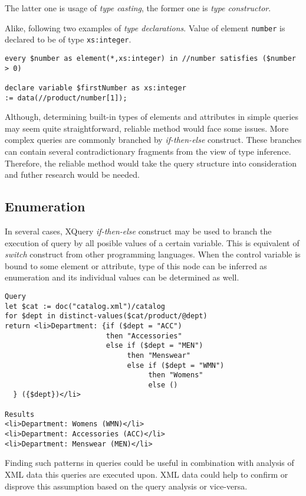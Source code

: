 The latter one is usage of \emph{type casting}, the former one is \emph{type constructor}.

Alike, following two examples of \emph{type declarations}. Value of element \texttt{number} is declared to be of type \texttt{xs:integer}.

\begin{verbatim}
every $number as element(*,xs:integer) in //number satisfies ($number > 0) 

declare variable $firstNumber as xs:integer 
:= data(//product/number[1]); 
\end{verbatim}

Although, determining built-in types of elements and attributes in simple queries may seem quite straightforward, reliable method would face some issues. More complex queries are commonly branched by \emph{if-then-else} construct. These branches can contain several contradictionary fragments from the view of type inference. Therefore, the reliable method would take the query structure into consideration and futher research would be needed.

\subsection{Enumeration}
In several cases, XQuery \emph{if-then-else} construct may be used to branch the execution of query by all posible values of a certain variable. This is equivalent of \emph{switch} construct from other programming languages. When the control variable is bound to some element or attribute, type of this node can be inferred as enumeration and its individual values can be determined as well.

\begin{verbatim}
Query
let $cat := doc("catalog.xml")/catalog 
for $dept in distinct-values($cat/product/@dept) 
return <li>Department: {if ($dept = "ACC") 
                        then "Accessories" 
                        else if ($dept = "MEN") 
                             then "Menswear" 
                             else if ($dept = "WMN") 
                                  then "Womens" 
                                  else () 
  } ({$dept})</li> 

Results 
<li>Department: Womens (WMN)</li> 
<li>Department: Accessories (ACC)</li> 
<li>Department: Menswear (MEN)</li> 
\end{verbatim}

Finding such patterns in queries could be useful in combination with analysis of XML data this queries are executed upon. XML data could help to confirm or disprove this assumption based on the query analysis or vice-versa.

